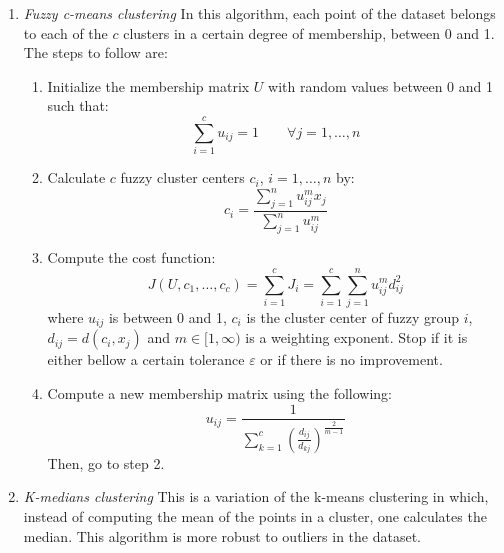 \documentclass[conference]{IEEEtran}
\begin{document}
\begin{enumerate}
    \item \textit{Fuzzy c-means clustering}
    In this algorithm, each point of the dataset belongs to each of the $c$ clusters in a certain degree of membership, between 0 and 1. The steps to follow are:
    \begin{enumerate}
        \item Initialize the membership matrix $U$ with random values between 0 and 1 such that:
        \begin{equation*}
            \sum_{i=1}^c u_{ij} = 1 \qquad \forall j=1,\dots, n
        \end{equation*}
        \item Calculate $c$ fuzzy cluster centers $c_i$, $i = 1,\dots,n$ by:
        \begin{equation*}
            c_i = \frac{\sum_{j=1}^n u_{ij}^m x_j}{\sum_{j=1}^n u_{ij}^m}
        \end{equation*}
        \item Compute the cost function:
        \begin{equation*}
            J(U,c_1,\dots,c_c) = \sum_{i=1}^cJ_i = \sum_{i=1}^c\sum_{j=1}^n u_{ij}^md_{ij}^2
        \end{equation*}
        where $u_{ij}$ is between 0 and 1, $c_i$ is the cluster center of fuzzy group $i$, $d_{ij} = d(c_i,x_j)$ and $m\in[1,\infty)$ is a weighting exponent. Stop if it is either bellow a certain tolerance $\varepsilon$ or if there is no improvement.
        \item Compute a new membership matrix using the following:
        \begin{equation*}
            u_{ij} = \frac{1}{\sum_{k=1}^c\left(\frac{d_{ij}}{d_{kj}}\right)^{\frac{2}{m-1}}}
        \end{equation*}
        Then, go to step 2.
    \end{enumerate}
    \item \textit{K-medians clustering} This is a variation of the k-means clustering \cite{median} in which, instead of computing the mean of the points in a cluster, one calculates the median. This algorithm is more robust to outliers in the dataset.
\end{enumerate}
\end{document}
